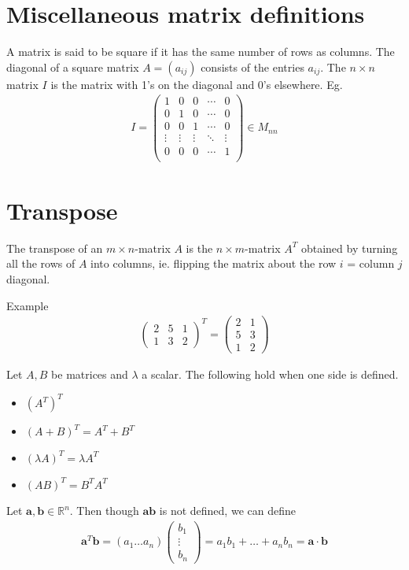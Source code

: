 \documentclass{report}
\renewcommand{\vec}{\mathbf}
\newcommand{\cvec}[1]{ \begin{pmatrix} #1 \end{pmatrix} }
\begin{document}
	\section{Miscellaneous matrix definitions}

	A matrix is said to be square if it has the same number of rows as columns. The diagonal of a square matrix $A = (a_{ij})$ consists of the entries $a_{ij}$. The $n\times n$ matrix $I$ is the matrix with 1's on the diagonal and 0's elsewhere. Eg.
	\begin{align*}
		I = \cvec{
			1 & 0 & 0 & \cdots & 0	\\
			0 & 1 & 0 & \cdots & 0	\\
			0 & 0 & 1 & \cdots & 0	\\
			\vdots & \vdots & \vdots & \ddots & \vdots	\\
			0 & 0 & 0 & \cdots & 1	\\
		} \in M_{nn}
	\end{align*}

	\section{Transpose}

	The transpose of an $m \times n$-matrix $A$ is the $n\times m$-matrix $A^T$ obtained by turning all the rows of $A$ into columns, ie. flipping the matrix about the row $i$ = column $j$ diagonal.
	\begin{question}{Example}
		\begin{align*}
			\cvec{2&5&1\\1&3&2}^T = \cvec{2&1\\5&3\\1&2}
		\end{align*}
	\end{question}

	Let $A,B$ be matrices and $\lambda$ a scalar. The following hold when one side is defined.
	\begin{itemize}
		\item $\left(A^T\right)^T$
		\item $(A+B)^T = A^T + B^T$
		\item $(\lambda A)^T = \lambda A^T$
		\item $(AB)^T = B^TA^T$
	\end{itemize}
	
	Let $\vec{a},\vec{b} \in \mathbb{R}^n$. Then though $\vec{ab}$ is not defined, we can define
	\begin{align*}
		\vec{a}^T\vec{b} = (a_1 \dots a_n) \cvec{b_1\\\vdots\\b_n} = a_1b_1 + \dots + a_nb_n = \vec{a} \cdot \vec{b}
	\end{align*}
\end{document}

